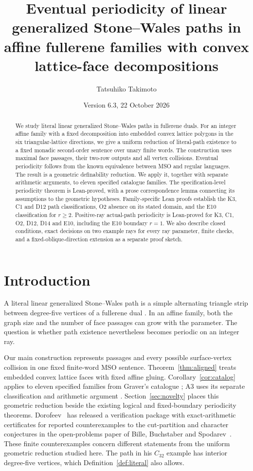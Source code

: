 \documentclass[11pt]{amsart}
\title[Affine fullerene families and eventual periodicity]{Eventual periodicity of linear generalized Stone--Wales paths in affine fullerene families with convex lattice-face decompositions}
\author{Tatsuhiko Takimoto}
\date{Version 6.3, 22 October 2026}
\theoremstyle{definition}\newtheorem{definition}{Definition}
\begin{document}
\begin{abstract}
We study literal linear generalized Stone--Wales paths in fullerene
duals. For an integer affine family with a fixed decomposition into
embedded convex lattice polygons in the six triangular-lattice
directions, we give a uniform reduction of literal-path existence to a
fixed monadic second-order sentence over unary finite words. The
construction uses maximal face passages, their two-row outputs and all
vertex collisions. Eventual periodicity follows from the known equivalence
between MSO and regular languages. The result is a geometric definability
reduction. We apply it, together with separate arithmetic arguments,
to eleven specified catalogue families. The specification-level
periodicity theorem is Lean-proved, with a prose correspondence lemma
connecting its assumptions to the geometric hypotheses. Family-specific
Lean proofs establish the K3, C1 and D12 path classifications, O2
absence on its stated domain, and the E10 classification for $r\ge2$.
Positive-ray actual-path periodicity is Lean-proved for K3, C1, O2,
D12, D14 and E10, including the E10 boundary $r=1$. We also describe closed conditions, exact decisions on
two example rays for every ray parameter, finite checks, and a
fixed-oblique-direction extension as a separate proof sketch.
\end{abstract}
\maketitle

\section{Introduction}
A literal linear generalized Stone--Wales path is a simple alternating
triangle strip between degree-five vertices of a fullerene dual
\cite{BBS}. In an affine family, both the graph size and the number of
face passages can grow with the parameter. The question is whether
path existence nevertheless becomes periodic on an integer ray.

Our main construction represents passages and every possible
surface-vertex collision in one fixed finite-word MSO sentence.
Theorem~\ref{thm:aligned} treats embedded convex lattice faces with
fixed affine gluing. Corollary~\ref{cor:catalog} applies to eleven
specified families from Graver's catalogue \cite{Graver}; A3 uses its
separate classification and arithmetic argument \cite{A3}.
Section~\ref{sec:novelty} places this geometric reduction beside the
existing logical and fixed-boundary periodicity theorems.
Dorofeev~\cite{Dorofeev} has released a verification package with
exact-arithmetic certificates for reported counterexamples to the
cut-partition and character conjectures in the open-problems paper of
Bille, Buchstaber and Spodarev~\cite{BBS}.
These finite counterexamples concern different statements from the
uniform geometric reduction studied here. The path in his $C_{32}$
example has interior degree-five vertices, which
Definition~\ref{def:literal} also allows.
\end{document}
